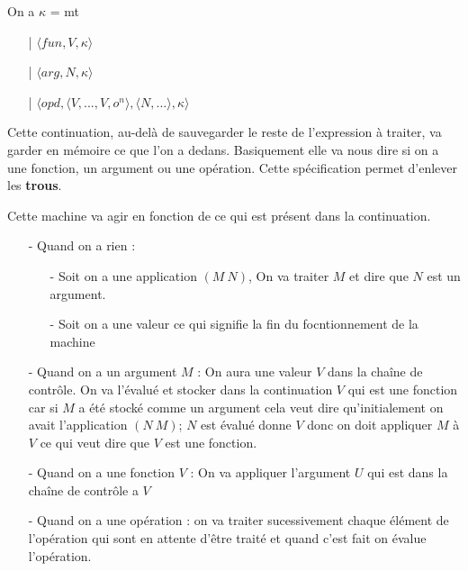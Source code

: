 \documentclass[10pt,a4paper]{report}
\begin{document}
On a $\kappa$ = mt
\begin{itemize}
\item[|] $\langle fun,V,\kappa \rangle$
\item[|] $\langle arg,N,\kappa \rangle$
\item[|] $\langle opd,\langle V,...,V,o^{n}\rangle,\langle N,... \rangle,\kappa \rangle$
\end{itemize}
\smallbreak
Cette continuation, au-delà de sauvegarder le reste de l'expression à traiter, va garder en mémoire ce que l'on a dedans. Basiquement elle va nous dire si on a une fonction, un argument ou une opération. Cette spécification permet d'enlever les \textbf{trous}.
\medbreak

Cette machine va agir en fonction de ce qui est présent dans la continuation.
\begin{itemize}
\item[] - Quand on a rien :
  \begin{itemize}
  \item[] - Soit on a une application $(M~N)$, On va traiter $M$ et dire que $N$ est un argument.
  \item[] - Soit on a une valeur ce qui signifie la fin du focntionnement de la machine
  \end{itemize}
\item[] - Quand on a un argument $M$ : On aura une valeur $V$ dans la chaîne de contrôle. On va l'évalué et stocker dans la continuation $V$ qui est une fonction car si $M$ a été stocké comme un argument cela veut dire qu'initialement on avait l'application $(N~M)$; $N$ est évalué donne $V$ donc on doit appliquer $M$ à $V$ ce qui veut dire que $V$ est une fonction.
\item[] - Quand on a une fonction $V$ : On va appliquer l'argument $U$ qui est dans la chaîne de contrôle a $V$
\item[] - Quand on a une opération : on va traiter sucessivement chaque élément de l'opération qui sont en attente d'être traité et quand c'est fait on évalue l'opération. 
\end{itemize}
\bigbreak
\end{document}
